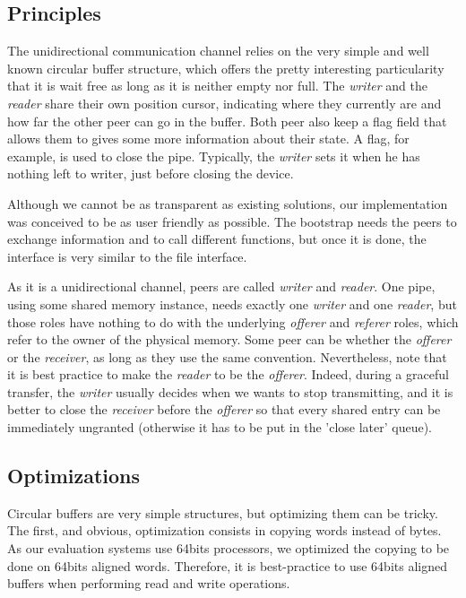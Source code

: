 \documentclass[journal]{IEEEtran}
\begin{document}
\subsection{Principles}

The unidirectional communication channel relies on the very simple and well known circular buffer structure, which offers the pretty interesting particularity that it is wait free as long as it is neither empty nor full. The \emph{writer} and the \emph{reader} share their own position cursor, indicating where they currently are and how far the other peer can go in the buffer. Both peer also keep a flag field that allows them to gives some more information about their state. A flag, for example, is used to close the pipe. Typically, the \emph{writer} sets it when he has nothing left to writer, just before closing the device. 

Although we cannot be as transparent as existing solutions, our implementation was conceived to be as user friendly as possible. The bootstrap needs the peers to exchange information and to call different functions, but once it is done, the interface is very similar to the file interface. 

As it is a unidirectional channel, peers are called \emph{writer} and \emph{reader}. One pipe, using some shared memory instance, needs exactly one \emph{writer} and one \emph{reader}, but those roles have nothing to do with the underlying \emph{offerer} and \emph{referer} roles, which refer to the owner of the physical memory. Some peer can be whether the \emph{offerer} or the \emph{receiver}, as long as they use the same convention. Nevertheless, note that it is best practice to make the \emph{reader} to be the \emph{offerer}. Indeed, during a graceful transfer, the \emph{writer} usually decides when we wants to stop transmitting, and it is better to close the \emph{receiver} before the \emph{offerer} so that every shared entry can be immediately ungranted (otherwise it has to be put in the 'close later' queue).

\subsection{Optimizations}

Circular buffers are very simple structures, but optimizing them can be tricky. The first, and obvious, optimization consists in copying words instead of bytes. As our evaluation systems use 64bits processors, we optimized the copying to be done on 64bits aligned words. Therefore, it is best-practice to use 64bits aligned buffers when performing read and write operations. 
\end{document}
